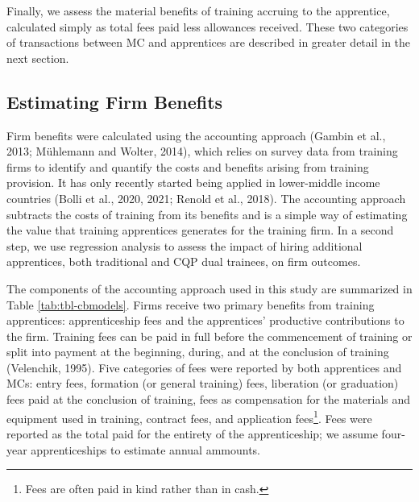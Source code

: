 \documentclass[
  11pt,
a4paper
]{report}
\begin{document}
Finally, we assess the material benefits of training accruing to the apprentice, calculated simply as total fees paid less allowances received. These two categories of transactions between MC and apprentices are described in greater detail in the next section.

\hypertarget{firmmethod}{%
\subsection{Estimating Firm Benefits}\label{firmmethod}}



Firm benefits were calculated using the accounting approach (Gambin et al., 2013; Mühlemann and Wolter, 2014), which relies on survey data from training firms to identify and quantify the costs and benefits arising from training provision. It has only recently started being applied in lower-middle income countries (Bolli et al., 2020, 2021; Renold et al., 2018). The accounting approach subtracts the costs of training from its benefits and is a simple way of estimating the value that training apprentices generates for the training firm. In a second step, we use regression analysis to assess the impact of hiring additional apprentices, both traditional and CQP dual trainees, on firm outcomes.

The components of the accounting approach used in this study are summarized in Table \ref{tab:tbl-cbmodels}. Firms receive two primary benefits from training apprentices: apprenticeship fees and the apprentices' productive contributions to the firm. Training fees can be paid in full before the commencement of training or split into payment at the beginning, during, and at the conclusion of training (Velenchik, 1995). Five categories of fees were reported by both apprentices and MCs: entry fees, formation (or general training) fees, liberation (or graduation) fees paid at the conclusion of training, fees as compensation for the materials and equipment used in training, contract fees, and application fees\footnote{Fees are often paid in kind rather than in cash.}. Fees were reported as the total paid for the entirety of the apprenticeship; we assume four-year apprenticeships to estimate annual ammounts.
\end{document}
